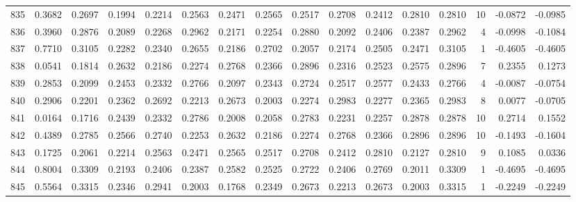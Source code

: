 \begin{tabular}{lrrrrrrrrrrrrrrr}
835 &      0.3682 &  0.2697 &  0.1994 &  0.2214 &  0.2563 &  0.2471 &  0.2565 &  0.2517 &  0.2708 &  0.2412 &   0.2810 &     0.2810 &     10 &                   -0.0872 &                    -0.0985 \\
836 &      0.3960 &  0.2876 &  0.2089 &  0.2268 &  0.2962 &  0.2171 &  0.2254 &  0.2880 &  0.2092 &  0.2406 &   0.2387 &     0.2962 &      4 &                   -0.0998 &                    -0.1084 \\
837 &      0.7710 &  0.3105 &  0.2282 &  0.2340 &  0.2655 &  0.2186 &  0.2702 &  0.2057 &  0.2174 &  0.2505 &   0.2471 &     0.3105 &      1 &                   -0.4605 &                    -0.4605 \\
838 &      0.0541 &  0.1814 &  0.2632 &  0.2186 &  0.2274 &  0.2768 &  0.2366 &  0.2896 &  0.2316 &  0.2523 &   0.2575 &     0.2896 &      7 &                    0.2355 &                     0.1273 \\
839 &      0.2853 &  0.2099 &  0.2453 &  0.2332 &  0.2766 &  0.2097 &  0.2343 &  0.2724 &  0.2517 &  0.2577 &   0.2433 &     0.2766 &      4 &                   -0.0087 &                    -0.0754 \\
840 &      0.2906 &  0.2201 &  0.2362 &  0.2692 &  0.2213 &  0.2673 &  0.2003 &  0.2274 &  0.2983 &  0.2277 &   0.2365 &     0.2983 &      8 &                    0.0077 &                    -0.0705 \\
841 &      0.0164 &  0.1716 &  0.2439 &  0.2332 &  0.2786 &  0.2008 &  0.2058 &  0.2783 &  0.2231 &  0.2257 &   0.2878 &     0.2878 &     10 &                    0.2714 &                     0.1552 \\
842 &      0.4389 &  0.2785 &  0.2566 &  0.2740 &  0.2253 &  0.2632 &  0.2186 &  0.2274 &  0.2768 &  0.2366 &   0.2896 &     0.2896 &     10 &                   -0.1493 &                    -0.1604 \\
843 &      0.1725 &  0.2061 &  0.2214 &  0.2563 &  0.2471 &  0.2565 &  0.2517 &  0.2708 &  0.2412 &  0.2810 &   0.2127 &     0.2810 &      9 &                    0.1085 &                     0.0336 \\
844 &      0.8004 &  0.3309 &  0.2193 &  0.2406 &  0.2387 &  0.2582 &  0.2525 &  0.2722 &  0.2406 &  0.2769 &   0.2011 &     0.3309 &      1 &                   -0.4695 &                    -0.4695 \\
845 &      0.5564 &  0.3315 &  0.2346 &  0.2941 &  0.2003 &  0.1768 &  0.2349 &  0.2673 &  0.2213 &  0.2673 &   0.2003 &     0.3315 &      1 &                   -0.2249 &                    -0.2249 \\

\end{tabular}
